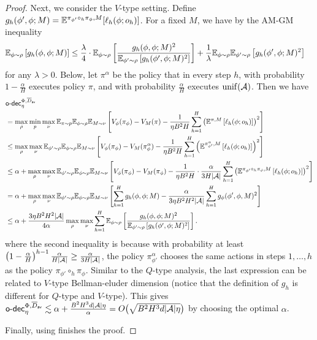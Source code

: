 \begin{proof}
    Next, we consider the $V$-type setting. Define $g_h(\phi', \phi; M)=\mathbb{E}^{\pi_{\phi'}\circ_h \pi_\phi, M}[\ell_h(\phi; o_h)]$.  For a fixed $M$, we have by the AM-GM inequality  
    \begin{align*}
        \mathbb{E}_{\phi\sim \rho} \left[g_h(\phi, \phi; M)\right] 
        &\leq  \frac{\lambda}{4}\cdot \mathbb{E}_{\phi\sim \rho} \left[\frac{g_h(\phi, \phi; M)^2}{\mathbb{E}_{\phi'\sim \rho} \left[g_h(\phi', \phi; M)^2\right]}\right] + \frac{1}{\lambda}\mathbb{E}_{\phi\sim \rho}\mathbb{E}_{\phi'\sim \rho} \left[g_h(\phi', \phi; M)^2\right]  
    \end{align*}
    for any $\lambda>0$. 
    Below, let $\pi^\alpha$ be the policy that in every step $h$, with probability $1-\frac{\alpha}{H}$ executes policy $\pi$, and with probability $\frac{\alpha}{H}$ executes $\operatorname*{unif}(\mathcal{A})$. Then we have 
    \begin{align*}
        &\mathsf{o}\text{-}\mathsf{dec}_\eta^{\Phi, \overline{D}_{\mathsf{av}}} \\
        &=\max_\rho \min_p \max_\nu \mathbb{E}_{\pi\sim p}\mathbb{E}_{\phi\sim \rho} \mathbb{E}_{M\sim \nu} \left[V_\phi(\pi_\phi) - V_M(\pi) - \frac{1}{\eta B^2H} \sum_{h=1}^H \left(\mathbb{E}^{\pi, M}\left[\ell_h(\phi; o_h)\right]\right)^2\right]  \\ 
        &\leq \max_\rho \max_\nu \mathbb{E}_{\phi'\sim \rho}\mathbb{E}_{\phi\sim \rho} \mathbb{E}_{M\sim \nu} \left[V_\phi(\pi_\phi) - V_M(\pi_\phi^\alpha) - \frac{1}{\eta B^2H} \sum_{h=1}^H \left(\mathbb{E}^{\pi_{\phi'}^\alpha, M}\left[\ell_h(\phi; o_h)\right]\right)^2\right]  \\
        &\leq \alpha + \max_\rho \max_\nu \mathbb{E}_{\phi'\sim \rho}\mathbb{E}_{\phi\sim \rho} \mathbb{E}_{M\sim \nu} \left[V_\phi(\pi_\phi) - V_M(\pi_\phi) - \frac{1}{\eta B^2H}\cdot\frac{\alpha}{3 H|\mathcal{A}|} \sum_{h=1}^H \left(\mathbb{E}^{\pi_{\phi'}\circ_h \pi_\phi, M}\left[\ell_h(\phi; o_h)\right]\right)^2\right]  \\
        &=\alpha + \max_\rho \max_\nu \mathbb{E}_{\phi'\sim \rho} \mathbb{E}_{\phi\sim \rho} \mathbb{E}_{M\sim \nu}\left[\sum_{h=1}^H g_h(\phi, \phi; M) - \frac{\alpha}{3\eta B^2 H^2|\mathcal{A}|} \sum_{h=1}^H  g_\phi(\phi', \phi, M)^2\right] \\
        &\leq \alpha + \frac{3\eta B^2H^2|\mathcal{A}|}{4\alpha} \max_{\rho}\max_\nu \sum_{h=1}^H  \mathbb{E}_{\phi\sim \rho} \left[\frac{g_h(\phi, \phi; M)^2}{\mathbb{E}_{\phi'\sim \rho} \left[g_h(\phi', \phi; M)^2\right]}\right]. 
    \end{align*}
    where the second inequality is because with probability at least $\left(1-\frac{\alpha}{H}\right)^{h-1}\frac{\alpha}{H|\mathcal{A}|}\geq \frac{\alpha}{3H|\mathcal{A}|}$, the policy $\pi^\alpha_{\phi'}$ chooses the same actions in steps $1,\ldots, h$ as the policy $\pi_{\phi'}\circ_h \pi_\phi$. 
    Similar to the $Q$-type analysis, the last expression can be related to $V$-type Bellman-eluder dimension (notice that the definition of $g_h$ is different for $Q$-type and $V$-type). This gives $\mathsf{o}\text{-}\mathsf{dec}_\eta^{\Phi, \overline{D}_{\mathsf{av}}}\lesssim \alpha + \frac{B^2 H^3 d|\mathcal{A}|\eta }{\alpha}=O\big(\sqrt{B^2 H^3 d|\mathcal{A}|\eta}\big)$ by choosing the optimal $\alpha$. 

    Finally, using  finishes the proof. 
\end{proof}


